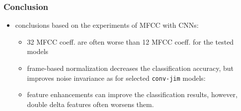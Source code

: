 \begin{frame}
  \frametitle{Conclusion}
  \begin{itemize}
    \item conclusions based on the experiments of MFCC with CNNs:
    \begin{itemize}
      \item 32 MFCC coeff. are often worse than 12 MFCC coeff. for the tested models
      \item frame-based normalization decreases the classification accuracy, but improves noise invariance as for selected \texttt{conv-jim} models:
      \vspace{-0.5cm}
      \begin{figure}[!ht]
        \centering
        \qquad
      \end{figure}
      \item feature enhancements can improve the classification results, however, double delta features often worsens them.
    \end{itemize}
  \end{itemize}
\end{frame}


